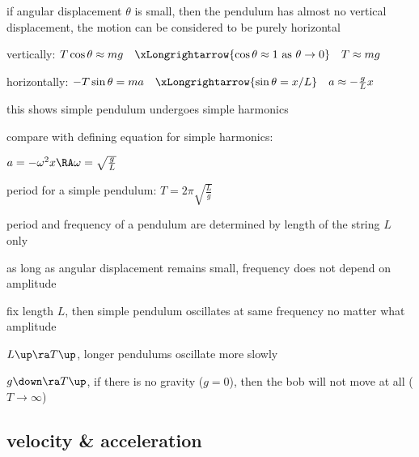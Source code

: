 if angular displacement $\theta$ is small, then the pendulum has almost no vertical displacement, the motion can be considered to be purely horizontal
		
vertically: $T\cos\theta \approx mg \quad \xLongrightarrow{\cos\theta\approx1 \text{ as } \theta\to0} \quad T\approx mg$
		
horizontally: $-T\sin\theta = ma \quad \xLongrightarrow{\sin\theta=x/L} \quad a \approx -\frac{g}{L}x$

this shows simple pendulum undergoes simple harmonics
	
compare with defining equation for simple harmonics:

{

\centering

$a=-\omega^2x \RA \omega = \sqrt{\frac{g}{L}}$

}
	
period for a simple pendulum: $\boxed{T= 2\pi\sqrt{\frac{L}{g}}}$

\cmt period and frequency of a pendulum are determined by length of the string $L$ only

as long as angular displacement remains small, frequency does not depend on amplitude

fix length $L$, then simple pendulum oscillates at same frequency no matter what amplitude

\cmt $L \up \ra T \up$, longer pendulums oscillate more slowly

\cmt $g \down \ra T \up$, if there is no gravity ($g=0$), then the bob will not move at all  ($T\to \infty$)





\subsection{velocity \& acceleration}


